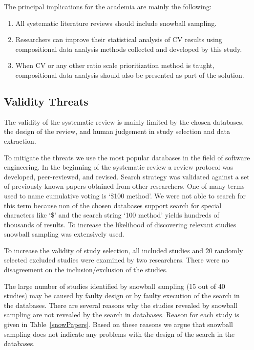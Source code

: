 The principal implications for the academia are mainly the following:

\begin{enumerate}
\item All systematic literature reviews should include snowball sampling.
\item Researchers can improve their statistical analysis of CV results using compositional data analysis methods collected and developed by this study.
\item When CV or any other ratio scale prioritization method is taught, compositional data analysis should also be presented as part of the solution.
\end{enumerate}

\subsection{Validity Threats}
The validity of the systematic review is mainly limited by the chosen databases, the design of the review, and human judgement in study selection and data extraction.

To mitigate the threats we use the most popular databases in the field of software engineering.
In the beginning of the systematic review a review protocol was developed, peer-reviewed, and revised.
Search strategy was validated against a set of previously known papers obtained from other researchers.
One of many terms used to name cumulative voting is `\$100 method'.
We were not able to search for this term because non of the chosen databases support search for special characters like `\$' and the search string `100 method' yields hundreds of thousands of results.
To increase the likelihood of discovering relevant studies snowball sampling was extensively used.

To increase the validity of study selection, all included studies and 20 randomly selected excluded studies were examined by two researchers.
There were no disagreement on the inclusion\slash exclusion of the studies.

The large number of studies identified by snowball sampling (15 out of 40 studies) may be caused by faulty design or by faulty execution of the search in the databases.
There are several reasons why the studies revealed by snowball sampling are not revealed by the search in databases. Reason for each study is given in Table~\ref{snowPapers}.
Based on these reasons we argue that snowball sampling does not indicate any problems with the design of the search in the databases.

